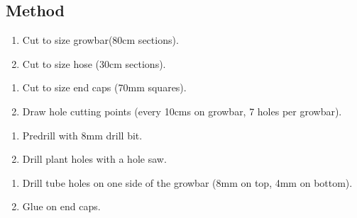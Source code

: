\documentclass[letterpaper,10pt,english]{sphinxmanual}
\begin{document}
\subsection{Method}
\label{\detokenize{growbars:method}}
\noindent{}
\begin{enumerate}
%
\item {} 
Cut to size growbar(80cm sections).

\item {} 
Cut to size hose (30cm sections).

\end{enumerate}

\noindent{}

\noindent{}

\noindent{}
\begin{enumerate}
%
\setcounter{enumi}{2}
\item {} 
Cut to size end caps (70mm squares).

\item {} 
Draw hole cutting points (every 10cms on growbar, 7 holes per growbar).

\end{enumerate}

\noindent{}
\begin{enumerate}
%
\setcounter{enumi}{4}
\item {} 
Predrill with 8mm drill bit.

\item {} 
Drill plant holes with a hole saw.

\end{enumerate}

\noindent{}

\noindent{}

\noindent{}
\begin{enumerate}
%
\setcounter{enumi}{6}
\item {} 
Drill tube holes on one side of the growbar (8mm on top, 4mm on bottom).

\item {} 
Glue on end caps.

\end{enumerate}
\end{document}

